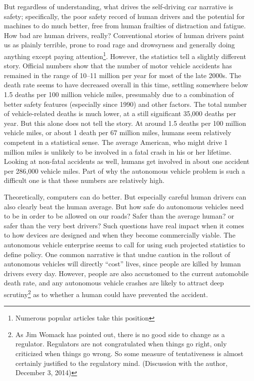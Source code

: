 But regardless of understanding, what drives the self-driving car
narrative is safety; specifically, the poor safety record of human
drivers and the potential for machines to do much better, free from
human frailties of distraction and fatigue. How bad are human
drivers, really? Conventional stories of human drivers paint us as
plainly terrible, prone to road rage and drowsyness and generally
doing anything except paying attention\footnote{Numerous popular
  articles take this position\cite{???}}. However, the statistics tell
a slightly different story. Official numbers show that the number of
motor vehicle accidents has remained in the range of 10--11 million
per year for most of the late 2000s. The death rate seems to have
decreased overall in this time, settling somewhere below 1.5 deaths
per 100 million vehicle miles, presumably due to a combination of
better safety features (especially since 1990) and other
factors.\cite{???} The total number of vehicle-related deaths is much
lower, at a still significant 35,000 deaths per year. But this alone
does not tell the story. At around 1.5 deaths per 100 million vehicle
miles, or about 1 death per 67 million miles, humans seem relatively
competent in a statistical sense. The average American, who might
drive 1 million miles\cite{???} is unlikely to be
involved in a fatal crash in his or her lifetime. Looking at non-fatal
accidents as well, humans get involved in about one accident per
286,000 vehicle miles. Part of why the autonomous vehicle problem is
such a difficult one is that these numbers are relatively high.

Theoretically, computers can do better. But especially careful human
drivers can also clearly beat the human average. But how safe do
autonomous vehicles need to be in order to be allowed on our roads?
Safer than the average human? or safer than the very best drivers?
Such questions have real impact when it comes to how devices are
designed and when they become commercially viable. The autonomous
vehicle enterprise seems to call for using such projected statistics
to define policy. One common narrative is that undue caution in the
rollout of autonomous vehicles will directly ``cost'' lives, since
people are killed by human drivers every day.\cite{???-blog} However,
people are also accustomed to the current automobile death rate, and
any autonomous vehicle crashes are likely to attract deep
scrutiny\footnote{As Jim Womack has pointed out, there is no good side
to change as a regulator. Regulators are not congratulated when things
go right, only criticized when things go wrong. So some measure of
tentativeness is almost certainly justified to the regulatory mind.
(Discussion with the author, December 3, 2014)} as
to whether a human could have prevented the accident.\cite{???}

